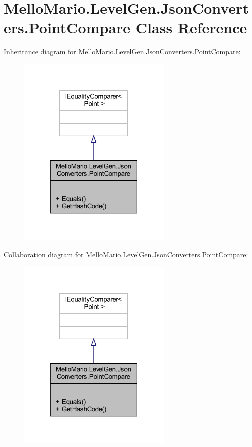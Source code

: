 \section{Mello\+Mario.\+Level\+Gen.\+Json\+Converters.\+Point\+Compare Class Reference}
\label{classMelloMario_1_1LevelGen_1_1JsonConverters_1_1PointCompare}


Inheritance diagram for Mello\+Mario.\+Level\+Gen.\+Json\+Converters.\+Point\+Compare\+:
\nopagebreak
\begin{figure}[H]
\begin{center}
\leavevmode
\includegraphics[width=210pt]{classMelloMario_1_1LevelGen_1_1JsonConverters_1_1PointCompare__inherit__graph}
\end{center}
\end{figure}


Collaboration diagram for Mello\+Mario.\+Level\+Gen.\+Json\+Converters.\+Point\+Compare\+:
\nopagebreak
\begin{figure}[H]
\begin{center}
\leavevmode
\includegraphics[width=210pt]{classMelloMario_1_1LevelGen_1_1JsonConverters_1_1PointCompare__coll__graph}
\end{center}
\end{figure}
